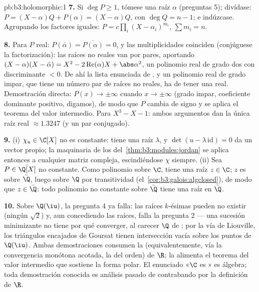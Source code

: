 \begin{solution}{pb:b3:holomorphic:1}
\textbf{7.} Si $\deg P \geq 1$, tómese una raíz $\alpha$ (preguntas 5);
divídase: $P = (X - \alpha)Q + P(\alpha) = (X -
\alpha)Q$, con $\deg Q = n - 1$; e indúzcase. Agrupando los factores
iguales: $P = c\prod_i(X - \alpha_i)^{m_i}$, $\sum m_i = n$.

\textbf{8.} Para $P$ real: $P(\bar\alpha) =
\overline{P(\alpha)} = 0$, y las multiplicidades coinciden (conjúguese
la factorización): las raíces no reales van por pares, aportando
$(X - \alpha)(X - \bar\alpha) = X^2 -
2\operatorname{Re}(\alpha)X + \abs\alpha^2$, un polinomio real de grado
dos con discriminante $< 0$. De ahí la lista enunciada de
, y un polinomio real de
grado impar, que tiene un número par de raíces no reales, ha de tener
una real. Demostración directa: $P(x) \to \pm\infty$ cuando
$x \to \pm\infty$ (grado impar, coeficiente dominante positivo,
digamos), de modo que $P$ cambia de signo y se aplica el teorema del
valor intermedio. Para $X^3 - X - 1$: ambos argumentos dan la única raíz
real $\approx 1.3247$ (y un par conjugado).

\textbf{9.} (i) $\chi_u \in \C[X]$ no es constante: tiene una raíz
$\lambda$, y $\det(u - \lambda\,\mathrm{id}) = 0$ da un vector propio;
la maquinaria de los 
del~\cref{thm:b3:modules:jordan} se aplica entonces a cualquier matriz
compleja, escindiéndose $\chi$ siempre. (ii) Sea $P \in \bar\Q[X]$ no
constante. Como polinomio sobre $\C$, tiene una raíz $z
\in \C$; $z$ es  sobre
$\bar\Q$, luego sobre $\Q$ por transitividad
(el~\cref{cor:b3:galois:algclosed}), de modo que $z \in
\bar\Q$: todo polinomio no constante sobre $\bar\Q$ tiene una raíz en
$\bar\Q$.

\textbf{10.} Sobre $\Q(\iu)$, la pregunta 4 ya falla: las raíces
$k$-ésimas pueden no existir (ningún $\sqrt2$) y, aun concediendo las
raíces, falla la pregunta 2 --- una sucesión minimizante no tiene por
qué converger, al carecer $\Q$ de
; por la vía de Liouville,
los triángulos  encajados de
Goursat tienen intersección vacía sobre los puntos de $\Q(\iu)$. Ambas
demostraciones consumen la
 (equivalentemente, vía la
convergencia monótona acotada, la
 del orden) de $\R$; la
 alimenta el teorema del
valor intermedio que sostiene la forma polar. El enunciado «$\C$ es
» es álgebra;
toda demostración conocida es análisis pasado de contrabando por la
definición de
$\R$.


\end{solution}

